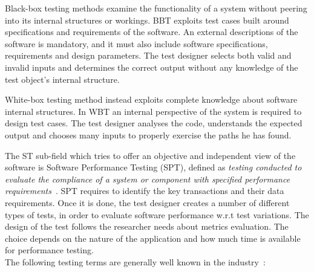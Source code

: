 Black-box testing  methods  examine the functionality of a system without peering into its internal structures or workings. BBT exploits test cases built around specifications and requirements of the software. An external descriptions of the software is mandatory, and it must also include software specifications, requirements and design parameters.  The test designer selects both valid and invalid inputs and determines the correct output without any knowledge of the test object's internal structure.

White-box testing  method instead exploits complete knowledge about software internal structures. In WBT an internal perspective of the system is required to design test cases. The test designer analyses the code, understands the expected output and chooses many inputs to properly exercise the paths he has found. 

The ST sub-field which tries to offer an objective and independent view of the software is Software Performance Testing (SPT), defined as  \textit{testing conducted to evaluate the compliance of a system or component with specified performance requirements}~\cite{IEEEStd610.12-1990:glossary}. SPT requires to identify the key transactions and their data requirements. Once it is done, the test designer creates a number of different types of tests, in order to evaluate software performance w.r.t test variations. The design of the test follows the researcher needs about metrics evaluation. The choice depends on the nature of the application and how much time is available for performance testing.\\

The following testing terms are generally well known in the industry~\cite{Molyneaux:2009:AAP:1550832}:

